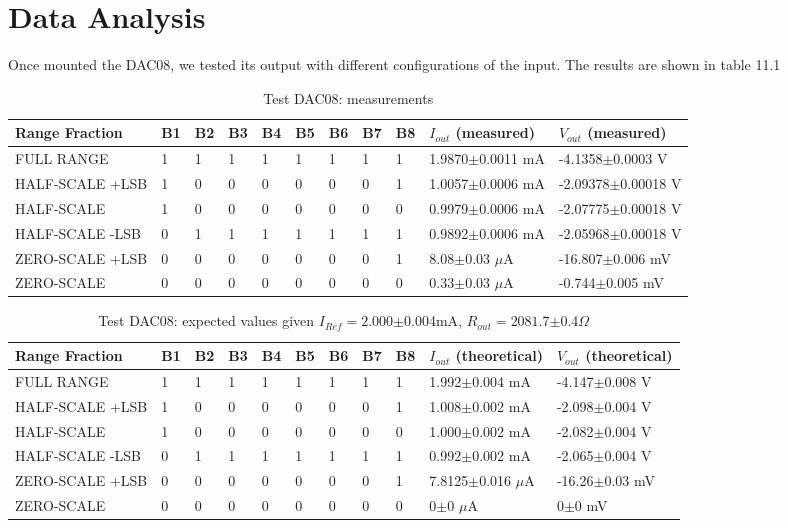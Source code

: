 \section{Data Analysis}
Once mounted the DAC08, we tested its output with different configurations of the input. The results are shown in table 11.1 \\

\begin{table}[H]
\centering
 \begin{tabular}{lllllllllll}
 \toprule
  Range Fraction & B1 & B2 & B3 & B4 & B5 & B6 & B7 & B8 & $I_{out}$ (measured) & $V_{out}$ (measured) \\
 \midrule
  FULL RANGE & 1 & 1 & 1 & 1 & 1 & 1 & 1 & 1 & 1.9870\(\pm\)0.0011 mA & -4.1358\(\pm\)0.0003 V \\
  HALF-SCALE +LSB & 1 & 0 & 0 & 0 & 0 & 0 & 0 & 1 & 1.0057\(\pm\)0.0006 mA & -2.09378\(\pm\)0.00018 V \\
  HALF-SCALE & 1 & 0 & 0 & 0 & 0 & 0 & 0 & 0 & 0.9979\(\pm\)0.0006 mA & -2.07775\(\pm\)0.00018 V \\
  HALF-SCALE  -LSB & 0 & 1 & 1 & 1 & 1 & 1 & 1 & 1 & 0.9892\(\pm\)0.0006 mA & -2.05968\(\pm\)0.00018 V \\
  ZERO-SCALE +LSB & 0 & 0 & 0 & 0 & 0 & 0 & 0 & 1 & 8.08\(\pm\)0.03 \(\mu\)A & -16.807\(\pm\)0.006 mV \\
  ZERO-SCALE & 0 & 0 & 0 & 0 & 0 & 0 & 0 & 0 & 0.33\(\pm\)0.03 \(\mu\)A & -0.744\(\pm\)0.005 mV \\
 \bottomrule
 \end{tabular}
\caption{Test DAC08: measurements}
\end{table}  

\begin{table}[H]
\centering
 \begin{tabular}{lllllllllll}
 \toprule
  Range Fraction & B1 & B2 & B3 & B4 & B5 & B6 & B7 & B8 & $I_{out}$ (theoretical) & $V_{out}$ (theoretical)\\
 \midrule
  FULL RANGE & 1 & 1 & 1 & 1 & 1 & 1 & 1 & 1 & 1.992\(\pm\)0.004 mA & -4.147\(\pm\)0.008 V \\
  HALF-SCALE +LSB & 1 & 0 & 0 & 0 & 0 & 0 & 0 & 1 & 1.008\(\pm\)0.002 mA & -2.098\(\pm\)0.004 V \\
  HALF-SCALE & 1 & 0 & 0 & 0 & 0 & 0 & 0 & 0 & 1.000\(\pm\)0.002 mA & -2.082\(\pm\)0.004 V \\
  HALF-SCALE  -LSB & 0 & 1 & 1 & 1 & 1 & 1 & 1 & 1 & 0.992\(\pm\)0.002 mA & -2.065\(\pm\)0.004 V \\
  ZERO-SCALE +LSB & 0 & 0 & 0 & 0 & 0 & 0 & 0 & 1 & 7.8125\(\pm\)0.016 \(\mu\)A & -16.26\(\pm\)0.03 mV \\
  ZERO-SCALE & 0 & 0 & 0 & 0 & 0 & 0 & 0 & 0 & 0\(\pm\)0 \(\mu\)A & 0\(\pm\)0 mV \\
 \bottomrule
 \end{tabular}
\caption{Test DAC08: expected values given $I_{Ref}=2.000$\(\pm\)0.004mA, $R_{out}=2081.7$\(\pm\)0.4\(\Omega\)}
\end{table}  

